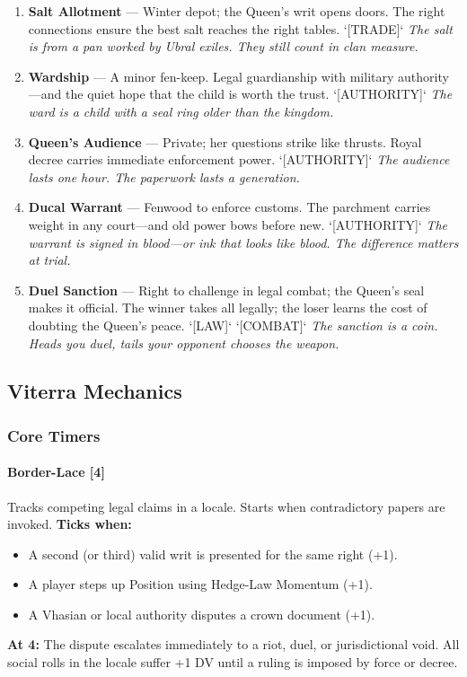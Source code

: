 \begin{enumerate}
  \hfill \textit{The ruling is carved on an oar. Break the oar, and the ruling breaks with it.}
\item \textbf{Salt Allotment} --- Winter depot; the Queen's writ opens doors. The right connections ensure the best salt reaches the right tables. `[TRADE]`
  \hfill \textit{The salt is from a pan worked by Ubral exiles. They still count in clan measure.}
\item[J] \textbf{Wardship} --- A minor fen-keep. Legal guardianship with military authority---and the quiet hope that the child is worth the trust. `[AUTHORITY]`
  \hfill \textit{The ward is a child with a seal ring older than the kingdom.}
\item[Q] \textbf{Queen's Audience} --- Private; her questions strike like thrusts. Royal decree carries immediate enforcement power. `[AUTHORITY]`
  \hfill \textit{The audience lasts one hour. The paperwork lasts a generation.}
\item[K] \textbf{Ducal Warrant} --- Fenwood to enforce customs. The parchment carries weight in any court---and old power bows before new. `[AUTHORITY]`
  \hfill \textit{The warrant is signed in blood---or ink that looks like blood. The difference matters at trial.}
\item[A] \textbf{Duel Sanction} --- Right to challenge in legal combat; the Queen's seal makes it official. The winner takes all legally; the loser learns the cost of doubting the Queen's peace. `[LAW]` `[COMBAT]`
  \hfill \textit{The sanction is a coin. Heads you duel, tails your opponent chooses the weapon.}
\end{enumerate}

\subsection{Viterra Mechanics}
\label{sec:viterra-mechanics}

\subsubsection{Core Timers}

\paragraph{Border-Lace [4]}
Tracks competing legal claims in a locale. Starts when contradictory papers are invoked. \textbf{Ticks when:}
\begin{itemize}[nosep]
  \item A second (or third) valid writ is presented for the same right (+1).
  \item A player steps up Position using Hedge-Law Momentum (+1).
  \item A Vhasian or local authority disputes a crown document (+1).
\end{itemize}
\textbf{At 4:} The dispute escalates immediately to a riot, duel, or jurisdictional void. All social rolls in the locale suffer +1 DV until a ruling is imposed by force or decree.

